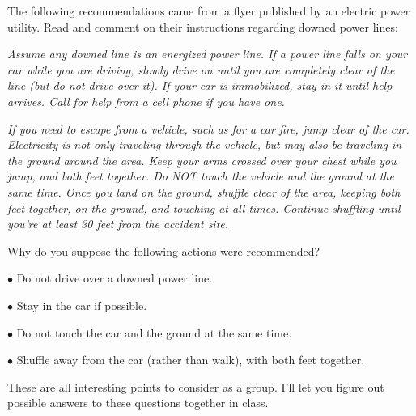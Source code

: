 

The following recommendations came from a flyer published by an electric power utility.  Read and comment on their instructions regarding downed power lines:

\vskip 10pt {\narrower \noindent \baselineskip5pt

{\it Assume any downed line is an energized power line.  If a power line falls on your car while you are driving, slowly drive on until you are completely clear of the line (but do not drive over it).  If your car is immobilized, stay in it until help arrives.  Call for help from a cell phone if you have one.}

{\it If you need to escape from a vehicle, such as for a car fire, jump clear of the car.  Electricity is not only traveling through the vehicle, but may also be traveling in the ground around the area.  Keep your arms crossed over your chest while you jump, and both feet together.  Do NOT touch the vehicle and the ground at the same time.  Once you land on the ground, shuffle clear of the area, keeping both feet together, on the ground, and touching at all times.  Continue shuffling until you're at least 30 feet from the accident site.}

\par} \vskip 10pt

Why do you suppose the following actions were recommended?

\medskip
\goodbreak
\item{$\bullet$} Do not drive over a downed power line.
\item{$\bullet$} Stay in the car if possible.
\item{$\bullet$} Do not touch the car and the ground at the same time.
\item{$\bullet$} Shuffle away from the car (rather than walk), with both feet together.
\medskip







These are all interesting points to consider as a group.  I'll let you figure out possible answers to these questions together in class.






